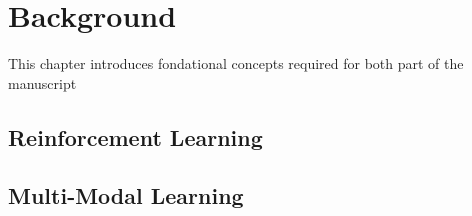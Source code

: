 \chapter{Background}

This chapter introduces fondational concepts required for both part of the manuscript
\section{Reinforcement Learning}
\section{Multi-Modal Learning}